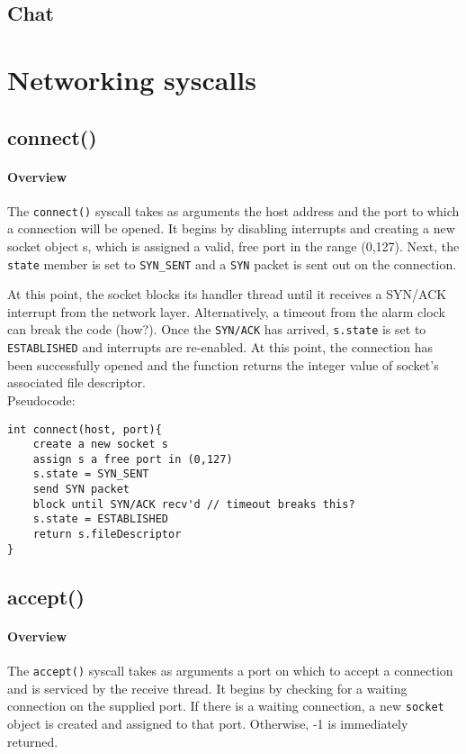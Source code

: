 \documentclass[]{article}
\begin{document}
\subsection{Chat}

\section{Networking syscalls}
\subsection{connect()}

\paragraph{Overview}
The \texttt{connect()} syscall takes as arguments the host address and the port to which a connection will be opened. It begins by disabling interrupts and creating a new socket object s, which is assigned a valid, free port in the range (0,127). Next, the \texttt{state} member is set to \texttt{SYN\_SENT} and a \texttt{SYN} packet is sent out on the connection. 

At this point, the socket blocks its handler thread until it receives a SYN/ACK interrupt from the network layer. Alternatively, a timeout from the alarm clock can break the code (how?). Once the \texttt{SYN/ACK} has arrived, \texttt{s.state} is set to \texttt{ESTABLISHED} and interrupts are re-enabled. At this point, the connection has been successfully opened and the function returns the integer value of socket's associated file descriptor. \\


\noindent Pseudocode:

\begin{lstlisting}
int connect(host, port){
	create a new socket s
	assign s a free port in (0,127)
	s.state = SYN_SENT
	send SYN packet
	block until SYN/ACK recv'd // timeout breaks this?
	s.state = ESTABLISHED
	return s.fileDescriptor
}
\end{lstlisting}

\subsection{accept()}
\paragraph{Overview}
The \texttt{accept()} syscall takes as arguments a port on which to accept a connection and is serviced by the receive thread. It begins by checking for a waiting connection on the supplied port. If there is a waiting connection, a new \texttt{socket} object is created and assigned to that port. Otherwise, -1 is immediately returned.
\end{document}

